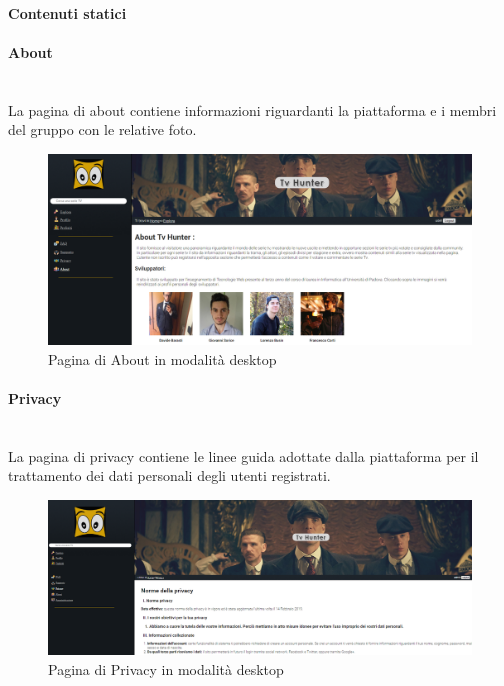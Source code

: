 \paragraph{Contenuti statici}

\paragraph{About} 
~\\	
La pagina di about contiene informazioni riguardanti la piattaforma e i membri del gruppo con le relative foto. 
\begin{figure}[H]
	\centerline{\includegraphics[scale=0.33]{img/about.png}}
	\caption{Pagina di About in modalità desktop}
	\label{fig:addForm} 
\end{figure}	

\paragraph{Privacy} 
~\\	
La pagina di privacy contiene le linee guida adottate dalla piattaforma per il trattamento dei dati personali degli utenti registrati.
\begin{figure}[h!]
	\centerline{\includegraphics[scale=0.23]{img/privacy.png}}
	\caption{Pagina di Privacy in modalità desktop}
	\label{fig:addForm} 
\end{figure}

